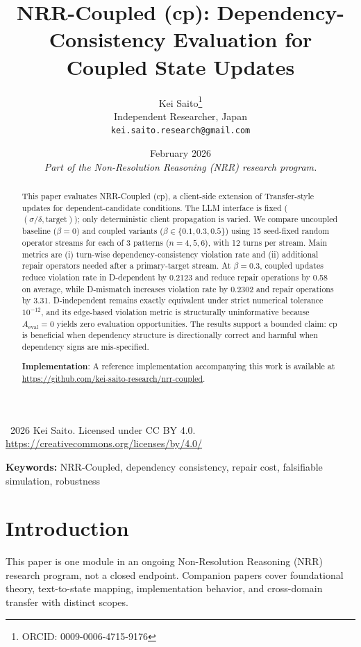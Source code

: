 \documentclass[11pt,a4paper]{article}
\title{\textbf{NRR-Coupled (cp): Dependency-Consistency Evaluation for Coupled State Updates}}
\author{Kei Saito\thanks{ORCID: 0009-0006-4715-9176}\\Independent Researcher, Japan\\\texttt{kei.saito.research@gmail.com}}
\date{February 2026\\[0.5em]\textit{Part of the Non-Resolution Reasoning (NRR) research program.}}
\begin{document}
\maketitle

\begin{center}
\textcopyright\ 2026 Kei Saito. Licensed under CC BY 4.0.\\
\url{https://creativecommons.org/licenses/by/4.0/}
\end{center}

\begin{abstract}
This paper evaluates NRR-Coupled (cp), a client-side extension of Transfer-style updates for dependent-candidate conditions. The LLM interface is fixed (\((\sigma/\delta,\text{target})\)); only deterministic client propagation is varied. We compare uncoupled baseline (\(\beta=0\)) and coupled variants (\(\beta\in\{0.1,0.3,0.5\}\)) using 15 seed-fixed random operator streams for each of 3 patterns (\(n=4,5,6\)), with 12 turns per stream. Main metrics are (i) turn-wise dependency-consistency violation rate and (ii) additional repair operators needed after a primary-target stream. At \(\beta=0.3\), coupled updates reduce violation rate in D-dependent by 0.2123 and reduce repair operations by 0.58 on average, while D-mismatch increases violation rate by 0.2302 and repair operations by 3.31. D-independent remains exactly equivalent under strict numerical tolerance \(10^{-12}\), and its edge-based violation metric is structurally uninformative because \(A_{\text{eval}}=0\) yields zero evaluation opportunities. The results support a bounded claim: cp is beneficial when dependency structure is directionally correct and harmful when dependency signs are mis-specified.

\textbf{Implementation}: A reference implementation accompanying this work is available at \url{https://github.com/kei-saito-research/nrr-coupled}.
\end{abstract}

\noindent\textbf{Keywords:} NRR-Coupled, dependency consistency, repair cost, falsifiable simulation, robustness

\section{Introduction}
This paper is one module in an ongoing Non-Resolution Reasoning (NRR) research program, not a closed endpoint. Companion papers cover foundational theory, text-to-state mapping, implementation behavior, and cross-domain transfer with distinct scopes\cite{saito2025nrr,saito2026phi,saito2026transfer}.
\end{document}
